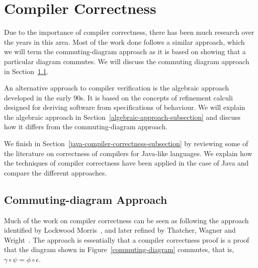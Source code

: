 \documentclass[a4paper,10pt]{report}
\begin{document}
\section{Compiler Correctness}
\label{compiler-correctness-section}

Due to the importance of compiler correctness, there has been much research over
the years in this area.  Most of the work done follows a similar approach, which
we will term the commuting-diagram approach as it is based on showing that a
particular diagram commutes. We will discuss the commuting diagram approach in
Section~\ref{commuting-diagram-subsection}.

An alternative approach to compiler verification is the algebraic approach
developed in the early 90s.  It is based on the concepts of refinement calculi
designed for deriving software from specifications of behaviour. We will explain
the algebraic approach in Section~\ref{algebraic-approach-subsection} and
discuss how it differs from the commuting-diagram approach.

We finish in Section~\ref{java-compiler-correctness-subsection} by reviewing
some of the literature on correctness of compilers for Java-like languages. We
explain how the techniques of compiler correctness have been applied in the case
of Java and compare the different approaches.

\subsection{Commuting-diagram Approach}
\label{commuting-diagram-subsection}

Much of the work on compiler correctness can be seen as following the approach
identified by Lockwood Morris~\cite{morris1973}, and later refined by Thatcher,
Wagner and Wright~\cite{thatcher1979}. The approach is essentially that a
compiler correctness proof is a proof that the diagram shown in
Figure~\ref{commuting-diagram} commutes, that is, $\gamma \circ \psi = \phi
\circ \epsilon$.
\end{document}
